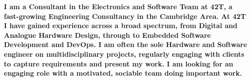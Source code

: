\begin{minipage}{170mm}
  \bfseries
  I am a Consultant in the Electronics and Software Team at 42T, a fast-growing Engineering Consultancy in the Cambridge Area.
  At 42T I have gained experience across a broad spectrum, from Digital and Analogue Hardware Design, through to Embedded Software Development and DevOps.
  I am often the sole Hardware and Software engineer on multidisciplinary projects, regularly engaging with clients to capture requirements and present my work. 
  I am looking for an engaging role with a motivated, sociable team doing important work.
\end{minipage}
